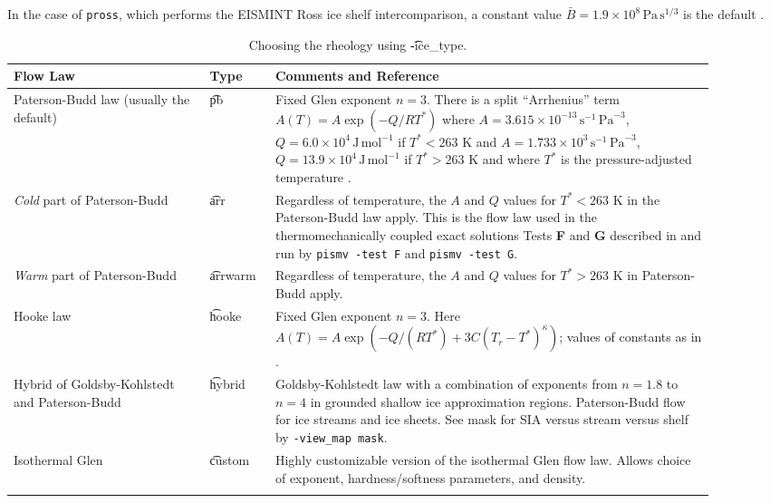 In the case of \texttt{pross}, which performs the EISMINT Ross ice shelf intercomparison, a constant value $\bar B = 1.9 \times 10^8 \, \text{Pa}\, \text{s}^{1/3}$ is the default \cite{MacAyealetal}.

\begin{table}[ht]
\centering
\caption{Choosing the rheology using \t{-ice_type}.}\label{tab:flowlaw}
\small
\begin{tabular}{p{0.25\linewidth}p{0.08\linewidth}p{0.57\linewidth}}\hline
\textbf{Flow Law} & \textbf{Type} & \textbf{Comments and Reference} \\ \hline
Paterson-Budd law (usually the default)  &  \t{pb} &   Fixed Glen exponent $n=3$.  There is a split ``Arrhenius'' term $A(T) = A \exp(-Q/RT^*)$ where \mbox{$A = 3.615 \times 10^{-13}\, \text{s}^{-1}\, \text{Pa}^{-3}$}, \mbox{$Q = 6.0 \times 10^4\, \text{J}\, \text{mol}^{-1}$} if $T^* < 263$ K and
 \mbox{$A = 1.733 \times 10^{3}\, \text{s}^{-1}\, \text{Pa}^{-3}$}, \mbox{$Q = 13.9 \times 10^4\, \text{J}\, \text{mol}^{-1}$} if $T^* > 263$ K and where $T^*$ is the pressure-adjusted temperature \cite{PatersonBudd}. \\
\emph{Cold} part of Paterson-Budd &  \t{arr} &   Regardless of temperature, the $A$ and $Q$ values for $T^*<263$ K in  the Paterson-Budd law apply.  This is the flow law used in the thermomechanically coupled exact solutions Tests \textbf{F} and \textbf{G} described in \cite{BBL,BB} and run by \texttt{pismv -test F} and \texttt{pismv -test G}. \\

\emph{Warm} part of Paterson-Budd     &  \t{arrwarm} & Regardless of temperature, the $A$ and $Q$ values for $T^*>263$ K in Paterson-Budd apply.\\
Hooke law   &  \t{hooke} &  Fixed Glen exponent $n=3$.  Here  $A(T) = A \exp(-Q/(RT^*) + 3C (T_r - T^*)^\kappa)$; values of  constants as in \cite{Hooke,PayneBaldwin}.\\
Hybrid of Goldsby-Kohlstedt and Paterson-Budd & \t{hybrid} &     Goldsby-Kohlstedt law with a combination of exponents  from $n=1.8$ to $n=4$ \cite{GoldsbyKohlstedt} in grounded  shallow ice approximation regions.  Paterson-Budd flow  for ice streams and ice sheets. See mask for SIA versus stream versus shelf by \texttt{-view_map mask}. \\
Isothermal Glen & \t{custom} & Highly customizable version of the isothermal Glen flow law.  Allows choice of exponent, hardness/softness parameters, and density. \\
\hline
\normalsize	
\end{tabular}
\end{table}

